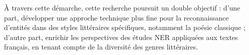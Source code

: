 À travers cette démarche, cette recherche poursuit un double objectif : d'une part, développer une approche technique plus fine pour la reconnaissance d'entités dans des styles littéraires spécifiques, notamment la poésie classique ; d'autre part, enrichir les perspectives des études NER appliquées aux textes français, en tenant compte de la diversité des genres littéraires.
